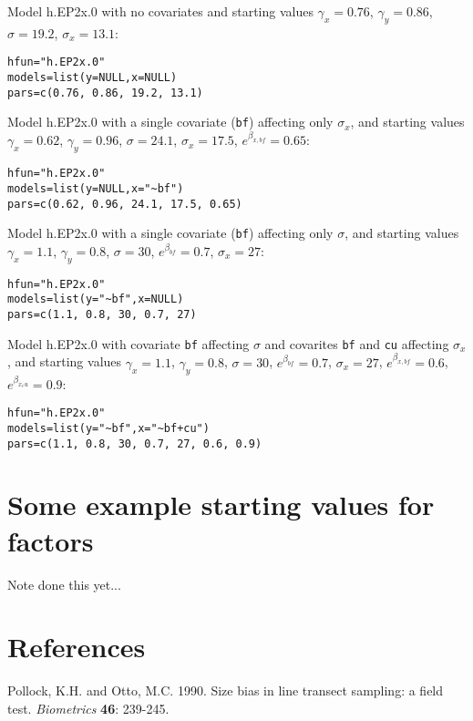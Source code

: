 \documentclass{article}
\begin{document}
\noindent
Model h.EP2x.0 with no covariates and starting values $\gamma_x=0.76$, $\gamma_y=0.86$, $\sigma=19.2$, $\sigma_x=13.1$:
\begin{verbatim}
hfun="h.EP2x.0"
models=list(y=NULL,x=NULL)
pars=c(0.76, 0.86, 19.2, 13.1)
\end{verbatim}

\noindent
Model h.EP2x.0 with a single covariate (\verb|bf|) affecting only $\sigma_x$, and starting values $\gamma_x=0.62$, $\gamma_y=0.96$, $\sigma=24.1$, $\sigma_x=17.5$, $e^{\beta_{x,bf}}=0.65$:
\begin{verbatim}
hfun="h.EP2x.0"
models=list(y=NULL,x="~bf")
pars=c(0.62, 0.96, 24.1, 17.5, 0.65)
\end{verbatim}

\noindent
Model h.EP2x.0 with a single covariate (\verb|bf|) affecting only $\sigma$, and starting values $\gamma_x=1.1$, $\gamma_y=0.8$, $\sigma=30$, $e^{\beta_{bf}}=0.7$, $\sigma_x=27$:
\begin{verbatim}
hfun="h.EP2x.0"
models=list(y="~bf",x=NULL)
pars=c(1.1, 0.8, 30, 0.7, 27)
\end{verbatim}

\noindent
Model h.EP2x.0 with covariate \verb|bf| affecting $\sigma$ and covarites \verb|bf| and \verb|cu| affecting $\sigma_x$, and starting values $\gamma_x=1.1$, $\gamma_y=0.8$, $\sigma=30$, $e^{\beta_{bf}}=0.7$, $\sigma_x=27$, $e^{\beta_{x,bf}}=0.6$, $e^{\beta_{x_cu}}=0.9$:
\begin{verbatim}
hfun="h.EP2x.0"
models=list(y="~bf",x="~bf+cu")
pars=c(1.1, 0.8, 30, 0.7, 27, 0.6, 0.9)
\end{verbatim}

\section{Some example starting values for factors}

Note done this yet...

\section*{References}

Pollock, K.H. and Otto, M.C. 1990. Size bias in line transect sampling: a field test. {\it Biometrics} {\bf 46}: 239-245.
\end{document}
